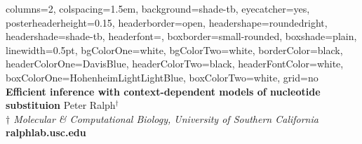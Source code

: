 \documentclass[fontscale=0.38]{baposter}
\begin{document}
\newlength{\leftimgwidth}
\begin{poster}%
  {
  columns=2,
  colspacing=1.5em,
  background=shade-tb,
  eyecatcher=yes,
  posterheaderheight=0.15\textheight,
  headerborder=open,
  headershape=roundedright,
  headershade=shade-tb,
  headerfont=\Large\textsf, %
  boxborder=small-rounded,
  boxshade=plain,
  linewidth=0.5pt,
  bgColorOne=white,
  bgColorTwo=white,
  borderColor=black,
  headerColorOne=DavisBlue,
  headerColorTwo=black,
  headerFontColor=white,
  boxColorOne=HohenheimLightLightBlue,
  boxColorTwo=white,
  grid=no
  }
  {
  }
  {\sf %
  \vspace{0.5em}
  \textbf{\textcolor{DavisBlue}{Efficient inference with context-dependent models of nucleotide substituion}}\vspace{0.5em}}
  {\sf %
    Peter Ralph$^{\dagger}$ \\  \vspace{-1.0mm}
    {\small \textit{$\dagger$ Molecular \& Computational Biology, University of Southern California }}\\  
    {\small   \textbf{ralphlab.usc.edu}}\\
  }
  {
  }


\end{poster}
\end{document}
